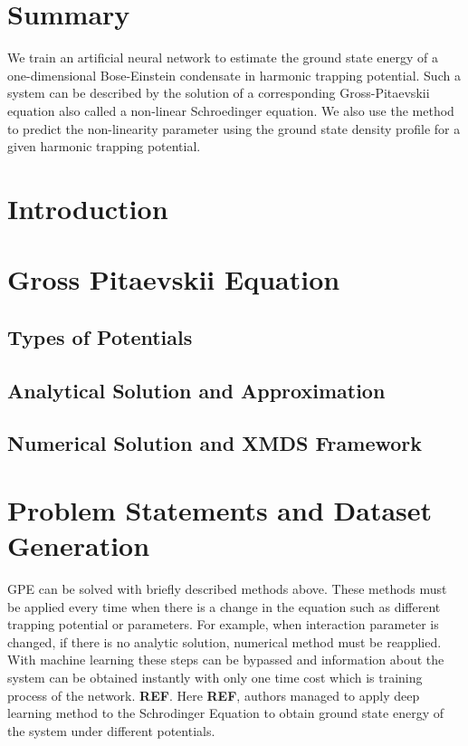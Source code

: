 \documentclass[a4paper,times,12pt]{article}
\title{}%
\date{}
\begin{document}
\setcounter{page}{1}

\section*{Summary}

We train an artificial neural network to estimate the ground state energy
of a one-dimensional Bose-Einstein condensate in harmonic trapping potential.
Such a system can be described by the solution of a corresponding
Gross-Pitaevskii equation also called a non-linear Schroedinger equation.
We also use the method to predict the non-linearity parameter using the ground
state density profile for a given harmonic trapping potential.


\section{Introduction}
\section{Gross Pitaevskii Equation}
\subsection{Types of Potentials}
\subsection{Analytical Solution and Approximation}
\subsection{Numerical Solution and XMDS Framework}
\section{Problem Statements and Dataset Generation}

GPE can be solved with briefly described methods above. These methods must be applied every time when there is a change in the equation such as different trapping potential or parameters. For example, when interaction parameter is changed, if there is no analytic solution, numerical method must be reapplied. With machine learning these steps can be bypassed and information about the system can be obtained instantly with only one time cost which is training process of the network. \textbf{REF}. Here \textbf{REF}, authors managed to apply deep learning method to the Schrodinger Equation to obtain ground state energy of the system under different potentials. 
\end{document}
